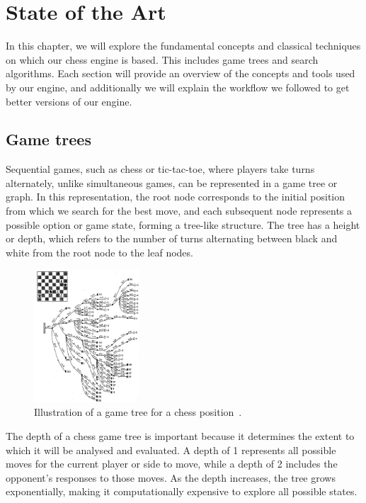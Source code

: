 \chapter{State of the Art}\label{cap:estadoDeLaCuestion}

In this chapter, we will explore the fundamental concepts and classical techniques on which our chess engine is based. This includes game trees and search algorithms. Each section will provide an overview of the concepts and tools used by our engine, and additionally we will explain the workflow we followed to get better versions of our engine.

\section{Game trees}

Sequential games, such as chess or tic-tac-toe, where players take turns alternately, unlike simultaneous games, can be represented in a game tree or graph. In this representation, the root node corresponds to the initial position from which we search for the best move, and each subsequent node represents a possible option or game state, forming a tree-like structure. The tree has a height or depth, which refers to the number of turns alternating between black and white from the root node to the leaf nodes.

\begin{figure}[H]
    \centering
    \includegraphics[width=0.35\textwidth]{Imagenes/chess-game-tree.jpg}
    \caption{Illustration of a game tree for a chess position~\cite{BotvinnikLongRangePlanning}.}\label{fig:game-tree}
\end{figure}

\noindent The depth of a chess game tree is important because it determines the extent to which it will be analysed and evaluated. A depth of 1 represents all possible moves for the current player or side to move, while a depth of 2 includes the opponent's responses to those moves. As the depth increases, the tree grows exponentially, making it computationally expensive to explore all possible states.

